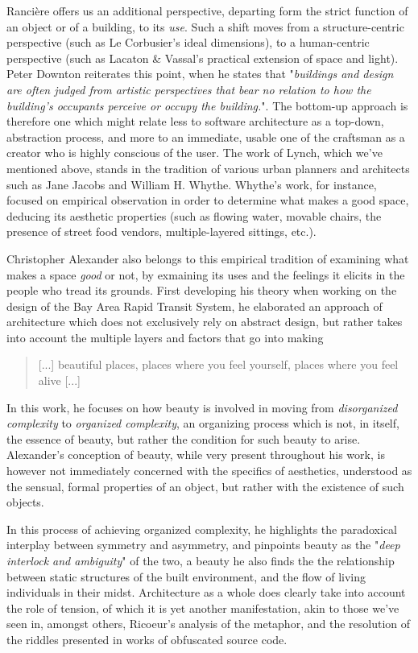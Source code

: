 \documentclass{article}
\begin{document}
Rancière offers us an additional perspective, departing form the strict function of an object or of a building, to its \emph{use}. Such a shift moves from a structure-centric perspective (such as Le Corbusier's ideal dimensions), to a human-centric perspective (such as Lacaton \& Vassal's practical extension of space and light). Peter Downton reiterates this point, when he states that "\emph{buildings and design are often judged from artistic perspectives that bear no relation to how the building’s occupants perceive or occupy the building.}"\cite{downton_knowledge_1998}. The bottom-up approach is therefore one which might relate less to software architecture as a top-down, abstraction process, and more to an immediate, usable one of the craftsman as a creator who is highly conscious of the user. The work of Lynch, which we've mentioned above, stands in the tradition of various urban planners and architects such as Jane Jacobs and William H. Whythe. Whythe's work, for instance, focused on empirical observation in order to determine what makes a good space, deducing its aesthetic properties (such as flowing water, movable chairs, the presence of street food vendors, multiple-layered sittings, etc.).

Christopher Alexander also belongs to this empirical tradition of examining what makes a space \emph{good} or not, by exmaining its uses and the feelings it elicits in the people who tread its grounds. First developing his theory when working on the design of the Bay Area Rapid Transit System, he elaborated an approach of architecture which does not exclusively rely on abstract design, but rather takes into account the multiple layers and factors that go into making 

\begin{quote}
  [...] beautiful places, places where you feel yourself, places where you feel alive\cite{alexander_timeless_1979} [...]
\end{quote}

In this work, he focuses on how beauty is involved in moving from \emph{disorganized complexity} to \emph{organized complexity}, an organizing process which is not, in itself, the essence of beauty, but rather the condition for such beauty to arise. Alexander's conception of beauty, while very present throughout his work, is however not immediately concerned with the specifics of aesthetics, understood as the sensual, formal properties of an object, but rather with the existence of such objects.

In this process of achieving organized complexity, he highlights the paradoxical interplay between symmetry and asymmetry, and pinpoints beauty as the "\emph{deep interlock and ambiguity}" of the two, a beauty he also finds the the relationship between static structures of the built environment, and the flow of living individuals in their midst. Architecture as a whole does clearly take into account the role of tension, of which it is yet another manifestation, akin to those we've seen in, amongst others, Ricoeur's analysis of the metaphor, and the resolution of the riddles presented in works of obfuscated source code.
\end{document}
